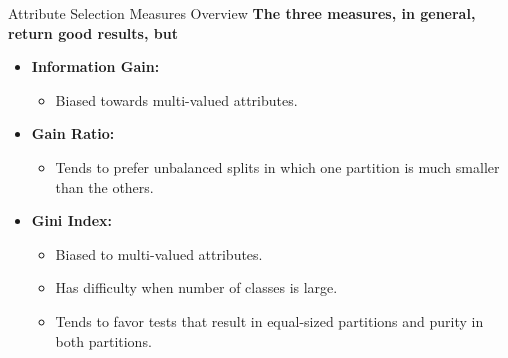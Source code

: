 \begin{frame}{Attribute Selection Measures Overview}
	\textbf{The three measures, in general, return good results, but}
	\begin{itemize}
		\item \textbf{\color{airforceblue}Information Gain:}
		      \begin{itemize}
			      \item Biased towards multi-valued attributes.
		      \end{itemize}
		\item \textbf{\color{airforceblue}Gain Ratio:}
		      \begin{itemize}
			      \item Tends to prefer unbalanced splits in which one partition is much smaller than the others.
		      \end{itemize}
		\item \textbf{\color{airforceblue}Gini Index:}
		      \begin{itemize}
			      \item Biased to multi-valued attributes.
			      \item Has difficulty when number of classes is large.
			      \item Tends to favor tests that result in equal-sized partitions and purity in both partitions.
		      \end{itemize}
	\end{itemize}
\end{frame}

